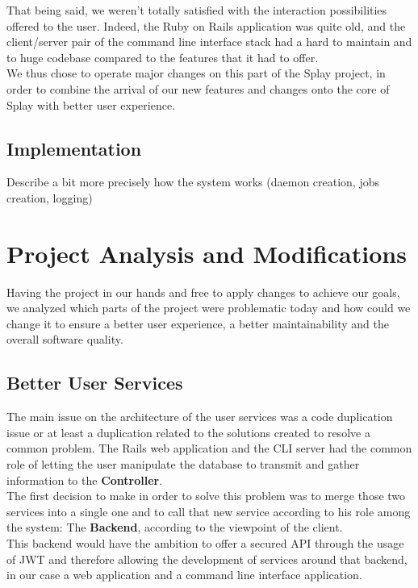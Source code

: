 \documentclass{eplmastersthesis}
\begin{document}
        That being said, we weren't totally satisfied with the interaction
        possibilities offered to the user. Indeed, the Ruby on Rails application
        was quite old, and the client/server pair of the command line interface
        stack had a hard to maintain and to huge codebase compared to the
        features that it had to offer.\\

        We thus chose to operate major changes on this part of the Splay
        project, in order to combine the arrival of our new features and
        changes onto the core of Splay with better user experience.

      \subsection{Implementation} %

        Describe a bit more precisely how the system works (daemon creation,
        jobs creation, logging)

    \section{Project Analysis and Modifications}

      Having the project in our hands and free to apply changes to achieve our
      goals, we analyzed which parts of the project were problematic today and
      how could we change it to ensure a better user experience, a better
      maintainability and the overall software quality.

      \subsection{Better User Services}

        The main issue on the architecture of the user services was a code
        duplication issue or at least a duplication related to the solutions
        created to resolve a common problem. The Rails web application and the
        CLI server had the common role of letting the user manipulate the
        database to transmit and gather information to the \textbf{Controller}.\\

        The first decision to make in order to solve this problem was to
        merge those two services into a single one and to call that new
        service according to his role among the system: The \textbf{Backend},
        according to the viewpoint of the client.\\
        This backend would have the ambition to offer a secured API through
        the usage of JWT \cite{JWT} and therefore allowing the development
        of services around that backend, in our case a web application and
        a command line interface application.\\
\end{document}
